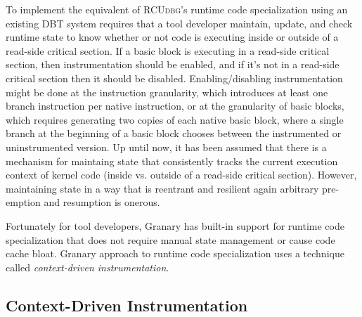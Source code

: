 \documentclass[preprint]{sigplanconf}
\newcommand{\toolname}[1]{{\scshape #1}}
\begin{document}
To implement the equivalent of \toolname{RCUdbg}'s runtime code specialization using an existing DBT system requires that a tool developer maintain, update, and check runtime state to know whether or not code is executing inside or outside of a read-side critical section. If a basic block is executing in a read-side critical section, then instrumentation should be enabled, and if it's not in a read-side critical section then it should be disabled. Enabling/disabling instrumentation might be done at the instruction granularity, which introduces at least one branch instruction per native instruction, or at the granularity of basic blocks, which requires generating two copies of each native basic block, where a single branch at the beginning of a basic block chooses between the instrumented or uninstrumented version. Up until now, it has been assumed that there is a mechanism for maintaing state that consistently tracks the current execution context of kernel code (inside vs. outside of a read-side critical section). However, maintaining state in a way that is reentrant and resilient again arbitrary pre-emption and resumption is onerous.


Fortunately for tool developers, Granary has built-in support for runtime code specialization that does not require manual state management or cause code cache bloat. Granary approach to runtime code specialization uses a technique called \emph{context-driven instrumentation}.


\subsection{Context-Driven Instrumentation}\label{sec:policies}
\end{document}
